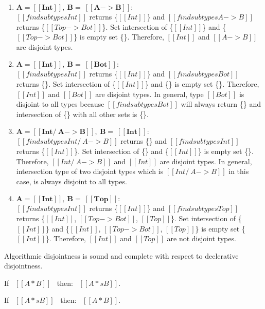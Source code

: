 \begin{enumerate}
  \item $\boldsymbol{A = [[Int]], \ B = \ [[A -> B]]:}$ \\
        $[[findsubtypes Int]]$ returns \{$[[Int]]$\} and $[[findsubtypes A -> B]]$ returns
        \{$[[Top -> Bot]]$\}. Set intersection of \{$[[Int]]$\} and \{$[[Top -> Bot]]$\} is
        empty set \{\}. Therefore, $[[Int]]$ and $[[A -> B]]$ are disjoint types.
  \item $\boldsymbol{A = [[Int]], \ B = \ [[Bot]]:}$ \\
        $[[findsubtypes Int]]$ returns \{$[[Int]]$\} and $[[findsubtypes Bot]]$ returns
        \{\}. Set intersection of \{$[[Int]]$\} and \{\} is
        empty set \{\}. Therefore, $[[Int]]$ and $[[Bot]]$ are disjoint types.
        In general, type $[[Bot]]$ is disjoint to all types because $[[findsubtypes Bot]]$
        will always return \{\} and intersection of \{\} with all other sets is \{\}.
  \item $\boldsymbol{A = [[Int /\ A -> B]], \ B = \ [[Int]]:}$ \\
        $[[findsubtypes Int /\ A -> B]]$ returns \{\} and $[[findsubtypes Int]]$ returns
        \{$[[Int]]$\}. Set intersection of \{\} and \{$[[Int]]$\} is
        empty set \{\}. Therefore, $[[Int /\ A -> B]]$ and $[[Int]]$ are disjoint types.
        In general, intersection type of two disjoint types which is $[[Int /\ A -> B]]$ in this case,
        is always disjoint to all types.
  \item $\boldsymbol{A = [[Int]], \ B = \ [[Top]]:}$ \\
        $[[findsubtypes Int]]$ returns \{$[[Int]]$\} and $[[findsubtypes Top]]$ returns
        \{$[[Int]]$, $[[Top -> Bot]]$, $[[Top]]$\}. 
        Set intersection of \{$[[Int]]$\} and \{$[[Int]]$, $[[Top -> Bot]]$, $[[Top]]$\} is
        empty set \{$[[Int]]$\}. Therefore, $[[Int]]$ and $[[Top]]$ are not disjoint types.
\end{enumerate}

Algorithmic disjointness is sound and complete with respect to declerative disjointness.

\begin{lemma}
  If \ $[[A * B]]$ \ then: \ $[[A *s B]]$.
\label{lemma:inter:disj-sound}
\end{lemma}

\begin{lemma}
  If \ $[[A *s B]]$ \ then: \ $[[A * B]]$.
\label{lemma:inter:disj-complete}
\end{lemma}

